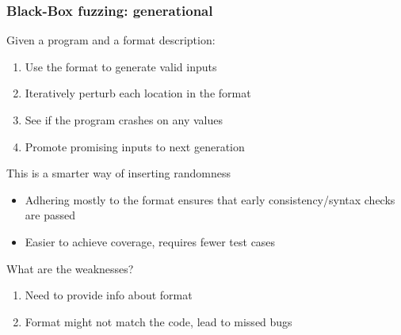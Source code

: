 \documentclass[10pt,xcolor={dvipsnames}]{beamer}
\begin{document}
\begin{frame}

\frametitle{Black-Box fuzzing: generational}

Given a program and a format description:
\begin{enumerate}
\item Use the format to generate valid inputs \\[0.5em]
\item Iteratively perturb each location in the format \\[0.5em]
\item See if the program crashes on any values \\[0.5em]
\item Promote promising inputs to next generation \\[1.5em]
\end{enumerate}

\pause
This is a smarter way of inserting randomness
\begin{itemize}
\item Adhering mostly to the format ensures that early consistency/syntax checks are passed \\[0.5em]
\item Easier to achieve coverage, requires fewer test cases \\[1.5em]
\end{itemize}

\pause
What are the weaknesses?
\begin{enumerate}
\pause\item Need to provide info about format \\[0.5em]
\pause\item Format might not match the code, lead to missed bugs
\end{enumerate}

\end{frame}

\end{document}
